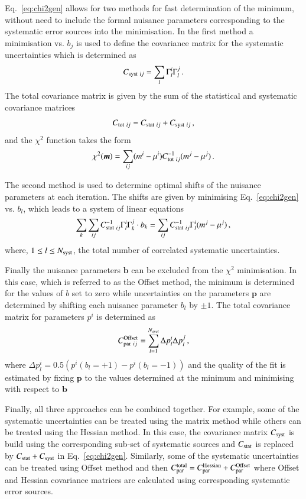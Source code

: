 \begin{description}
Eq.~\ref{eq:chi2gen} allows for two methods for fast determination
of the minimum, without need to include the formal nuisance parameters
corresponding to the systematic error sources into the \minuit minimisation.
In the first method a minimisation vs. $b_j$ is used to define the covariance
matrix for the systematic uncertainties which is determined as
\begin{equation}
 C_{{\rm syst}~ij}= \sum_l \Gamma^i_l \Gamma^j_l \,.
\end{equation}
The total covariance matrix is given by the sum of the statistical and
systematic covariance matrices
\begin{equation} 
C_{{\rm tot}~ij} = C_{{\rm stat}~ij} + C_{{\rm syst}~ij}\,,
\end{equation}
and the $\chi^2$ function takes the form
\begin{equation}
  \chi^2( \boldsymbol{m}) = \sum_{ij} ( m^i - \mu^i) C^{-1}_{{\rm tot}~ij} 
( m^j - \mu^j)\,.
\end{equation}

The second method is used to determine optimal shifts of the nuisance
parameters at each iteration. The shifts are given by minimising 
Eq.~\ref{eq:chi2gen} vs. $b_l$, which leads to a system of  linear equations 
\begin{equation}
 \sum_k \sum_{ij} C^{-1}_{{\rm stat}~ij} \Gamma^i_l \Gamma^j_k \cdot b_k = \sum_{ij} C^{-1}_{{\rm stat}~ij} \Gamma^i_l (m^j - \mu^j)\,,
\end{equation}
where, $1\le l \le N_{\rm syst}$, the total number of correlated systematic uncertainties.

Finally the nuisance parameters $\boldsymbol{b}$ can be excluded from the $\chi^2$ minimisation.  
In this case, which is referred to as the Offset method, the minimum is determined for the values of $b$ set to zero
while uncertainties on the parameters $\boldsymbol{p}$ are determined by shifting each nuisance parameter $b_l$
by $\pm 1$. The total covariance matrix for parameters $p^i$ is determined as 
\begin{equation}
  C^{\rm Offset}_{ {\rm par}~ ij} = \sum_{l=1}^{N_{syst}} \Delta p^i_l \Delta p^j_l \,,
\end{equation}
where $ \Delta p^i_l = 0.5 ( p^i( b_l = +1 ) - p^i(b_l = -1))$ and the quality of the fit is estimated by 
fixing $\boldsymbol{p}$ to the values determined at the minimum and minimising with respect to $\boldsymbol{b}$

Finally, all three approaches can be combined together. For example, some of the systematic uncertainties
can be treated using the matrix method while others can be treated using the Hessian method. In this case, the
covariance matrix  $C_{\rm syst}$ is build using the corresponding sub-set of systematic sources and $C_{\rm stat}$ 
is replaced by $C_{\rm stat}+C_{\rm syst}$ in Eq.~\ref{eq:chi2gen}. Similarly, some of the systematic uncertainties
can be treated using Offset method and then $C^{\rm total}_{ {\rm par}} = C^{\rm Hessian}_{\rm par} + C^{\rm Offset}_{\rm par}$
where Offset and Hessian covariance matrices are calculated using corresponding systematic error sources.


\end{description}

